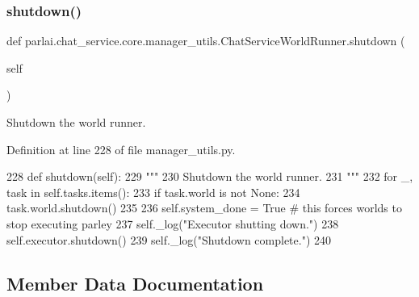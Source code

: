 \subsubsection{\texorpdfstring{shutdown()}{shutdown()}}
{\footnotesize\ttfamily def parlai.\+chat\+\_\+service.\+core.\+manager\+\_\+utils.\+Chat\+Service\+World\+Runner.\+shutdown (\begin{DoxyParamCaption}\item[{}]{self }\end{DoxyParamCaption})}

\begin{DoxyVerb}Shutdown the world runner.
\end{DoxyVerb}
 

Definition at line 228 of file manager\+\_\+utils.\+py.


\begin{DoxyCode}
228     \textcolor{keyword}{def }shutdown(self):
229         \textcolor{stringliteral}{"""}
230 \textcolor{stringliteral}{        Shutdown the world runner.}
231 \textcolor{stringliteral}{        """}
232         \textcolor{keywordflow}{for} \_, task \textcolor{keywordflow}{in} self.tasks.items():
233             \textcolor{keywordflow}{if} task.world \textcolor{keywordflow}{is} \textcolor{keywordflow}{not} \textcolor{keywordtype}{None}:
234                 task.world.shutdown()
235 
236         self.system\_done = \textcolor{keyword}{True}  \textcolor{comment}{# this forces worlds to stop executing parley}
237         self.\_log(\textcolor{stringliteral}{"Executor shutting down."})
238         self.executor.shutdown()
239         self.\_log(\textcolor{stringliteral}{"Shutdown complete."})
240 
\end{DoxyCode}


\subsection{Member Data Documentation}
\mbox{\label{classparlai_1_1chat__service_1_1core_1_1manager__utils_1_1ChatServiceWorldRunner_af71184b9bb3dc433adfd678b7a8097e7}} 
